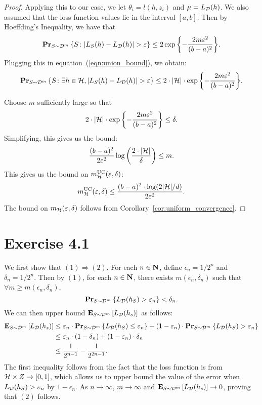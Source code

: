 \begin{proof}
Applying this to our case, we let $\theta_i = l(h, z_i)$ and $\mu = L_{\mathcal{D}}(h)$.
We also assumed that the loss function values lie in the interval $[a, b]$. Then
by Hoeffding's Inequality, we have that
\begin{equation}
    \mathbf{Pr}_{S \sim \mathcal{D}^m} \left \{ S \colon |L_S(h) - L_{\mathcal{D}}(h)| > \varepsilon \right \}
        \leq
    2 \exp{\left \{ - \frac{2 m \varepsilon^2}{(b - a)^2} \right \}}.
\end{equation}
Plugging this in equation~(\ref{eqn:union_bound}), we obtain:
\begin{equation}
    \mathbf{Pr}_{S \sim \mathcal{D}^m} \left \{ S \colon \exists h \in \mathcal{H}, |L_S(h) - L_{\mathcal{D}}(h)| > \varepsilon \right \}
        \leq
    2 \cdot |\mathcal{H}| \cdot \exp{\left \{ - \frac{2 m \varepsilon^2}{(b - a)^2} \right \}}.
\end{equation}

Choose $m$ sufficiently large so that
\[
    2 \cdot |\mathcal{H}| \cdot \exp{\left \{ - \frac{2 m \varepsilon^2}{(b - a)^2} \right \}} \leq \delta.
\]
Simplifying, this gives us the bound:
\[
    \frac{(b - a)^2}{2 \varepsilon^2} \log \left ( \frac{2 \cdot |\mathcal{H}|}{\delta}\right ) \leq m.
\]
This gives us the bound on $m_{\mathcal{H}}^{\text{UC}}(\varepsilon, \delta)$:
\[
    m_{\mathcal{H}}^{\text{UC}}(\varepsilon, \delta)
        \leq
    \frac{(b - a)^2 \cdot \log (2 |\mathcal{H}| / d)}{2 \varepsilon^2}.
\]
The bound on $m_{\mathcal{H}}(\varepsilon, \delta)$ follows from
Corollary~\ref{cor:uniform_convergence}.
\end{proof}

\section*{Exercise 4.1}

We first show that $(1) \Rightarrow (2)$. For each $n \in \mathbf{N}$, define
$\epsilon_n = 1 / 2^n$ and $\delta_n = 1 / 2^n$. Then by $(1)$, for each
$n \in \mathbf{N}$, there exists $m(\epsilon_n, \delta_n)$ such that
$\forall m \geq m(\epsilon_n, \delta_n)$,
\[
    \mathbf{Pr}_{S \sim \mathcal{D}^{m}} \left \{ L_{\mathcal{D}} (h_S) > \varepsilon_n \right \} < \delta_n.
\]
We can then upper bound $\mathbf{E}_{S \sim \mathcal{D}^m} \left [ L_{\mathcal{D}}(h_s) \right ]$ as follows:
\begin{align*}
\mathbf{E}_{S \sim \mathcal{D}^m} \left [ L_{\mathcal{D}} (h_s) \right ]
& \leq \varepsilon_n \cdot  \mathbf{Pr}_{S \sim \mathcal{D}^{m}} \left \{ L_{\mathcal{D}} (h_S) \leq \varepsilon_n \right \} +
    (1 - \varepsilon_n) \cdot  \mathbf{Pr}_{S \sim \mathcal{D}^{m}} \left \{ L_{\mathcal{D}} (h_S) > \varepsilon_n \right \} \\
& \leq \varepsilon_n \cdot (1 - \delta_n) + (1 - \varepsilon_n) \cdot \delta_n \\
& \leq \frac{1}{2^{n - 1}} - \frac{1}{2^{2n - 1}}.
\end{align*}
The first inequality follows from the fact that the loss function is from
$\mathcal{H} \times Z \rightarrow [0, 1]$, which allows us to upper bound the value of the error
when $L_{\mathcal{D}} (h_S) > \varepsilon_n$ by $1 - \epsilon_n$. As $n \to \infty$, $m \to \infty$
and $\mathbf{E}_{S \sim \mathcal{D}^m} \left [ L_{\mathcal{D}} (h_s) \right ] \to 0$, proving that $(2)$ follows.

